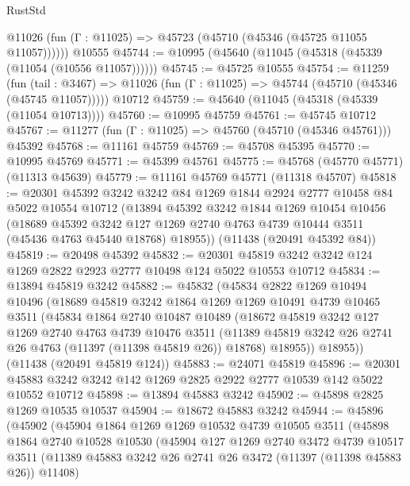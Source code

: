 \begin{lexlean}{RustStd}
\begin{coremodule}
      @11026 (fun (Γ : @11025) => @45723 (@45710 (@45346 (@45725 @11055 @11057))))))
    @10555
@45744 := @10995 (@45640 (@11045 (@45318 (@45339 (@11054 (@10556 @11057))))))
@45745 := @45725 @10555
@45754 := @11259
    (fun (tail : @3467) => @11026 (fun (Γ : @11025) => @45744 (@45710 (@45346 (@45745 @11057)))))
    @10712
@45759 := @45640 (@11045 (@45318 (@45339 (@11054 @10713))))
@45760 := @10995 @45759
@45761 := @45745 @10712
@45767 := @11277 (fun (Γ : @11025) => @45760 (@45710 (@45346 @45761))) @45392
@45768 := @11161 @45759
@45769 := @45708 @45395
@45770 := @10995 @45769
@45771 := @45399 @45761
@45775 := @45768 (@45770 @45771) (@11313 @45639)
@45779 := @11161 @45769 @45771 (@11318 @45707)
@45818 := @20301
    @45392
    @3242
    @3242
    @84
    @1269
    @1844
    @2924
    @2777
    @10458
    @84
    @5022
    @10554
    @10712
    (@13894
      @45392
      @3242
      @1844
      @1269
      @10454
      @10456
      (@18689
        @45392
        @3242
        @127
        @1269
        @2740
        @4763
        @4739
        @10444
        @3511
        (@45436 @4763 @45440 @18768)
        @18955))
    (@11438 (@20491 @45392 @84))
@45819 := @20498 @45392
@45832 := @20301 @45819 @3242 @3242 @124 @1269 @2822 @2923 @2777 @10498 @124 @5022 @10553 @10712
@45834 := @13894 @45819 @3242
@45882 := @45832
    (@45834
      @2822
      @1269
      @10494
      @10496
      (@18689
        @45819
        @3242
        @1864
        @1269
        @1269
        @10491
        @4739
        @10465
        @3511
        (@45834
          @1864
          @2740
          @10487
          @10489
          (@18672
            @45819
            @3242
            @127
            @1269
            @2740
            @4763
            @4739
            @10476
            @3511
            (@11389 @45819 @3242 @26 @2741 @26 @4763 (@11397 (@11398 @45819 @26)) @18768)
            @18955))
        @18955))
    (@11438 (@20491 @45819 @124))
@45883 := @24071 @45819
@45896 := @20301 @45883 @3242 @3242 @142 @1269 @2825 @2922 @2777 @10539 @142 @5022 @10552 @10712
@45898 := @13894 @45883 @3242
@45902 := @45898 @2825 @1269 @10535 @10537
@45904 := @18672 @45883 @3242
@45944 := @45896
    (@45902
      (@45904
        @1864
        @1269
        @1269
        @10532
        @4739
        @10505
        @3511
        (@45898
          @1864
          @2740
          @10528
          @10530
          (@45904
            @127
            @1269
            @2740
            @3472
            @4739
            @10517
            @3511
            (@11389 @45883 @3242 @26 @2741 @26 @3472 (@11397 (@11398 @45883 @26)) @11408)

\end{coremodule}
\end{lexlean}
